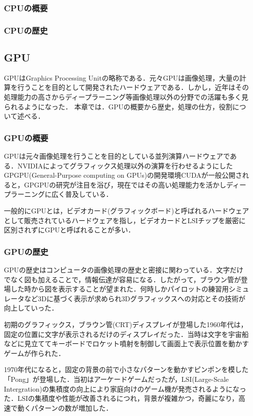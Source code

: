 \documentclass[a4j,12pt]{jsarticle}
\begin{document}
\subsubsection{CPUの概要}
\subsubsection{CPUの歴史}

\subsection{GPU}
GPUはGraphics Processing Unitの略称である．元々GPUは画像処理，大量の計算を行うことを目的として開発されたハードウェアである．しかし，近年はその処理能力の高さからディープラーニング等画像処理以外の分野での活躍も多く見られるようになった．
本章では．GPUの概要から歴史，処理の仕方，役割について述べる．

\subsubsection{GPUの概要}
GPUは元々画像処理を行うことを目的としている並列演算ハードウェアである．NVIDIAによってグラフィックス処理以外の演算を行わせるようにしたGPGPU(General-Purpose computing on GPUs)の開発環境CUDAが一般公開されると，GPGPUの研究が注目を浴び，現在ではその高い処理能力を活かしディープラーニングに広く普及している．

一般的にGPUとは，ビデオカード(グラフィックボード)と呼ばれるハードウェアとして販売されているハードウェアを指し，ビデオカードとLSIチップを厳密に区別されずにGPUと呼ばれることが多い．
\subsubsection{GPUの歴史}
GPUの歴史はコンピュータの画像処理の歴史と密接に関わっている．文字だけでなく図も加えることで，情報伝達が容易になる．したがって，ブラウン管が登場した時から図を表示することが望まれた．何時しかパイロットの練習用シミュレータなど3Dに基づく表示が求められ3Dグラフィックスへの対応とその技術が向上していった．

初期のグラフィックス，ブラウン管(CRT)ディスプレイが登場した1960年代は，固定の位置に文字が表示されるだけのディスプレイだった．当時は文字を宇宙船などに見立ててキーボードでロケット噴射を制御して画面上で表示位置を動かすゲームが作られた．

1970年代になると，固定の背景の前で小さなパターンを動かすピンポンを模した「Pong」が登場した．当初はアーケードゲームだったが，LSI(Large-Scale Intergration)の集積度の向上により家庭向けのゲーム機が発売されるようになった．LSIの集積度や性能が改善されるにつれ，背景が複雑かつ，奇麗になり，高速で動くパターンの数が増加した．
\end{document}
